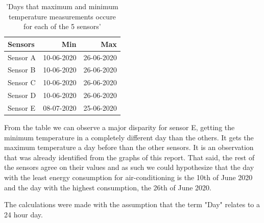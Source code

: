 \documentclass[a4paper,12pt]{article}
\begin{document}
\begin{table}[H]
\begin{center}
\begin{tabular}[\textwidth]{|l|r|r|} \hline 
\centering
    Sensors     & Min           & Max           \\\hline
    Sensor A    & 10-06-2020    & 26-06-2020    \\\hline
    Sensor B    & 10-06-2020    & 26-06-2020    \\\hline
    Sensor C    & 10-06-2020    & 26-06-2020    \\\hline
    Sensor D    & 10-06-2020    & 26-06-2020    \\\hline
    Sensor E    & 08-07-2020    & 25-06-2020    \\\hline
\end{tabular}
\caption{'Days that maximum and minimum temperature measurements occure for each of the 5 sensors'}
\end{center}
\end{table}

From the table we can observe a major disparity for sensor E, getting the minimum temperature in a completely different day than the others.
It gets the maximum temperature a day before than the other sensors. It is an observation that was already identified from the graphs of this report. 
That said, the rest of the sensors agree on their values and as such we could hypothesize that the day with the least energy consumption for air-conditioning 
is the 10th of June 2020 and the day with the highest consumption, the 26th of June 2020.


The calculations were made with the assumption that the term "Day" relates to a 24 hour day.




\end{document}
